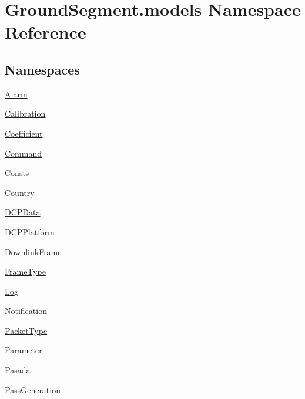 \hypertarget{namespace_ground_segment_1_1models}{}\section{Ground\+Segment.\+models Namespace Reference}
\label{namespace_ground_segment_1_1models}
\subsection*{Namespaces}
\begin{DoxyCompactItemize}
\item 
 \hyperlink{namespace_ground_segment_1_1models_1_1_alarm}{Alarm}
\item 
 \hyperlink{namespace_ground_segment_1_1models_1_1_calibration}{Calibration}
\item 
 \hyperlink{namespace_ground_segment_1_1models_1_1_coefficient}{Coefficient}
\item 
 \hyperlink{namespace_ground_segment_1_1models_1_1_command}{Command}
\item 
 \hyperlink{namespace_ground_segment_1_1models_1_1_consts}{Consts}
\item 
 \hyperlink{namespace_ground_segment_1_1models_1_1_country}{Country}
\item 
 \hyperlink{namespace_ground_segment_1_1models_1_1_d_c_p_data}{D\+C\+P\+Data}
\item 
 \hyperlink{namespace_ground_segment_1_1models_1_1_d_c_p_platform}{D\+C\+P\+Platform}
\item 
 \hyperlink{namespace_ground_segment_1_1models_1_1_downlink_frame}{Downlink\+Frame}
\item 
 \hyperlink{namespace_ground_segment_1_1models_1_1_frame_type}{Frame\+Type}
\item 
 \hyperlink{namespace_ground_segment_1_1models_1_1_log}{Log}
\item 
 \hyperlink{namespace_ground_segment_1_1models_1_1_notification}{Notification}
\item 
 \hyperlink{namespace_ground_segment_1_1models_1_1_packet_type}{Packet\+Type}
\item 
 \hyperlink{namespace_ground_segment_1_1models_1_1_parameter}{Parameter}
\item 
 \hyperlink{namespace_ground_segment_1_1models_1_1_pasada}{Pasada}
\item 
 \hyperlink{namespace_ground_segment_1_1models_1_1_pass_generation}{Pass\+Generation}
\item 

\end{DoxyCompactItemize}
